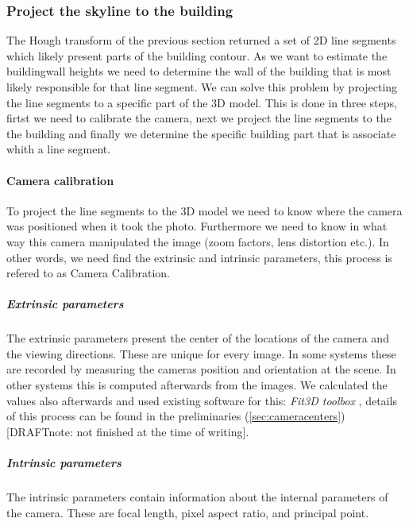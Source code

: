 \subsubsection{Project the skyline to the building}
	The Hough transform of the previous section returned a set of 2D line
	segments which likely present parts of the building contour.  
	As we want to estimate the buildingwall heights we need to determine the wall
	of the building that is most likely responsible for that line segment.
	We can solve this problem by projecting the line segments to a specific
	part of the 3D model.
	This is done in three steps, firtst we need to calibrate the camera, next we
	project the line segments to the the building and finally we 
	determine the specific building part that is associate whith a line segment.


	\paragraph{Camera calibration}
	To project the line segments to the 3D model we need to know where the
	camera was positioned when it took the photo. Furthermore we need to know
	in what way this camera manipulated the image (zoom factors, lens distortion
	etc.).  In other words, we need find the extrinsic and intrinsic parameters,
	this process is refered to as Camera Calibration.

	\subparagraph{Extrinsic parameters}
	The extrinsic parameters present the center of the locations of the camera
	and the viewing directions. These are unique for every image.
	In some systems these are recorded by measuring the cameras position and
	orientation at the scene. In other systems this is computed afterwards from the images.  
	We calculated the values also afterwards and used existing software for
	this: \emph{Fit3D toolbox} \cite{Fit3d}, details of this process can be
	found in the preliminaries (\ref{sec:cameracenters}) [DRAFTnote: not
	finished at the time of writing].\\  

	\subparagraph{Intrinsic parameters}
	The intrinsic parameters contain information about the internal parameters
	of the camera.  These are focal length, pixel aspect ratio, and principal point.

